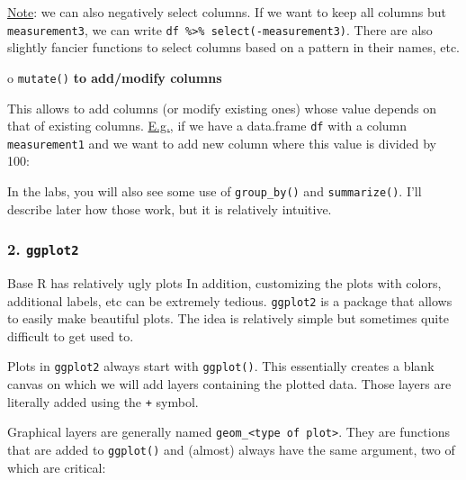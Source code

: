 \documentclass[
]{article}
\newenvironment{Shaded}{\begin{snugshade}}{\end{snugshade}}
\newcommand{\AttributeTok}[1]{\textcolor[rgb]{0.77,0.63,0.00}{#1}}
\newcommand{\CommentTok}[1]{\textcolor[rgb]{0.56,0.35,0.01}{\textit{#1}}}
\newcommand{\DecValTok}[1]{\textcolor[rgb]{0.00,0.00,0.81}{#1}}
\newcommand{\FunctionTok}[1]{\textcolor[rgb]{0.00,0.00,0.00}{#1}}
\newcommand{\NormalTok}[1]{#1}
\newcommand{\OtherTok}[1]{\textcolor[rgb]{0.56,0.35,0.01}{#1}}
\newcommand{\SpecialCharTok}[1]{\textcolor[rgb]{0.00,0.00,0.00}{#1}}
\begin{document}
\underline{Note}: we can also negatively select columns. If we want to
keep all columns but \texttt{measurement3}, we can write
\texttt{df\ \%\textgreater{}\%\ select(-measurement3)}. There are also
slightly fancier functions to select columns based on a pattern in their
names, etc.

o \texttt{mutate()} \textbf{to add/modify columns}

This allows to add columns (or modify existing ones) whose value depends
on that of existing columns. \underline{E.g.}, if we have a data.frame
\texttt{df} with a column \texttt{measurement1} and we want to add new
column where this value is divided by 100:

\begin{Shaded}
\end{Shaded}

In the labs, you will also see some use of \texttt{group\_by()} and
\texttt{summarize()}. I'll describe later how those work, but it is
relatively intuitive.

\hypertarget{ggplot2}{%
\subsubsection{\texorpdfstring{2.
\texttt{ggplot2}}{2. ggplot2}}\label{ggplot2}}

Base R has relatively ugly plots In addition, customizing the plots with
colors, additional labels, etc can be extremely tedious.
\texttt{ggplot2} is a package that allows to easily make beautiful
plots. The idea is relatively simple but sometimes quite difficult to
get used to.

Plots in \texttt{ggplot2} always start with \texttt{ggplot()}. This
essentially creates a blank canvas on which we will add layers
containing the plotted data. Those layers are literally added using the
\texttt{+} symbol.

Graphical layers are generally named
\texttt{geom\_\textless{}type\ of\ plot\textgreater{}}. They are
functions that are added to \texttt{ggplot()} and (almost) always have
the same argument, two of which are critical:
\end{document}

